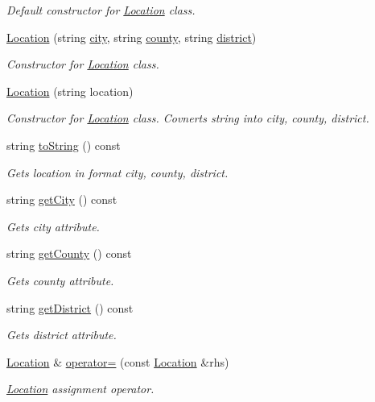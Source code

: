 \begin{DoxyCompactItemize}
\begin{DoxyCompactList}\small\item\em Default constructor for \hyperlink{class_location}{Location} class. \end{DoxyCompactList}\item 
\hyperlink{class_location_adde1be165887d4738c25164191107f8a}{Location} (string \hyperlink{class_location_a0179634b6ba4046f74f57949e789abfb}{city}, string \hyperlink{class_location_a648dadbf656ddaff096a36faa271a165}{county}, string \hyperlink{class_location_a3739b4e334dfd90923671fb543baef4a}{district})
\begin{DoxyCompactList}\small\item\em Constructor for \hyperlink{class_location}{Location} class. \end{DoxyCompactList}\item 
\hyperlink{class_location_aa41373bb46efc066f79ab697c56b0da3}{Location} (string location)
\begin{DoxyCompactList}\small\item\em Constructor for \hyperlink{class_location}{Location} class. Covnerts string into city, county, district. \end{DoxyCompactList}\item 
string \hyperlink{class_location_a4d91190cad2ea40b0e8d53f5211561a6}{to\+String} () const 
\begin{DoxyCompactList}\small\item\em Gets location in format city, county, district. \end{DoxyCompactList}\item 
string \hyperlink{class_location_ac682ee57f401c50a88d362305d159640}{get\+City} () const 
\begin{DoxyCompactList}\small\item\em Gets city attribute. \end{DoxyCompactList}\item 
string \hyperlink{class_location_aa200afd4afd7898f16c5e54c533da4ef}{get\+County} () const 
\begin{DoxyCompactList}\small\item\em Gets county attribute. \end{DoxyCompactList}\item 
string \hyperlink{class_location_a989ce807f112210952bad662d38185dd}{get\+District} () const 
\begin{DoxyCompactList}\small\item\em Gets district attribute. \end{DoxyCompactList}\item 
\hyperlink{class_location}{Location} \& \hyperlink{class_location_a41a15b0cfd590d365e31f613d32eebd1}{operator=} (const \hyperlink{class_location}{Location} \&rhs)
\begin{DoxyCompactList}\small\item\em \hyperlink{class_location}{Location} assignment operator. \end{DoxyCompactList}\end{DoxyCompactItemize}

